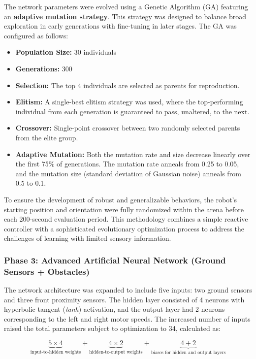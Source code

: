 \documentclass[final,5p,times,twocolumn,authoryear]{elsarticle}
\begin{document}
The network parameters were evolved using a Genetic Algorithm (GA) featuring an \textbf{adaptive mutation strategy}. This strategy was designed to balance broad exploration in early generations with fine-tuning in later stages. The GA was configured as follows:
\begin{itemize}
    \item \textbf{Population Size:} 30 individuals
    \item \textbf{Generations:} 300
    \item \textbf{Selection:} The top 4 individuals are selected as parents for reproduction.
    \item \textbf{Elitism:} A single-best elitism strategy was used, where the top-performing individual from each generation is guaranteed to pass, unaltered, to the next.
    \item \textbf{Crossover:} Single-point crossover between two randomly selected parents from the elite group.
    \item \textbf{Adaptive Mutation:} Both the mutation rate and size decrease linearly over the first 75\% of generations. The mutation rate anneals from 0.25 to 0.05, and the mutation size (standard deviation of Gaussian noise) anneals from 0.5 to 0.1.
\end{itemize}

To ensure the development of robust and generalizable behaviors, the robot’s starting position and orientation were fully randomized within the arena before each 200-second evaluation period. This methodology combines a simple reactive controller with a sophisticated evolutionary optimization process to address the challenges of learning with limited sensory information.



\subsubsection{Phase 3: Advanced Artificial Neural Network (Ground Sensors + Obstacles)}

The network architecture was expanded to include five inputs: two ground sensors and three front proximity sensors. The hidden layer consisted of 4 neurons with hyperbolic tangent (\textit{tanh}) activation, and the output layer had 2 neurons corresponding to the left and right motor speeds. The increased number of inputs raised the total parameters subject to optimization to 34, calculated as:

\[
\underbrace{5 \times 4}_{\text{input-to-hidden weights}} + \underbrace{4 \times 2}_{\text{hidden-to-output weights}} + \underbrace{4 + 2}_{\text{biases for hidden and output layers}}
\]
\end{document}
